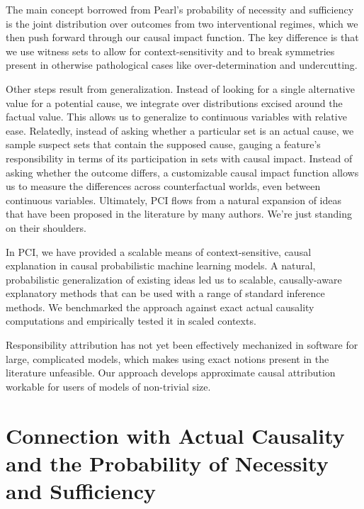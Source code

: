 \documentclass[anon,12pt]{clear2026} %
\newcommand{\ourapproach}{PCI }
\newcommand{\Ourapproach}{PCI}
\begin{document}
The main concept borrowed from Pearl's probability of necessity and sufficiency is the joint distribution over outcomes from two interventional regimes, which we then push forward through our causal impact function.  The key difference is that we use witness sets to allow for context-sensitivity and to break symmetries present in otherwise pathological cases like over-determination and undercutting.

Other steps result from generalization. Instead of looking for a single alternative value for a potential cause, we integrate over distributions excised around the factual value. This allows us to generalize to continuous variables with relative ease. Relatedly, instead of asking whether a particular set is an actual cause, we sample suspect sets that contain the supposed cause, gauging a feature's responsibility in terms of its participation in sets with causal impact. Instead of asking whether the outcome differs, a customizable causal impact function allows us to measure the differences across counterfactual worlds, even between continuous variables. Ultimately, \ourapproach flows from a natural expansion of ideas that have been proposed in the literature by many authors. We're just standing on their shoulders.


In \Ourapproach, we have provided a scalable means of context-sensitive, causal explanation in causal probabilistic machine learning models. A natural, probabilistic generalization of existing ideas led us to scalable, causally-aware explanatory methods that can be used with a range of standard inference methods. We benchmarked the approach against exact actual causality computations and empirically tested it in scaled contexts. 

Responsibility attribution has not yet been effectively mechanized in software for large, complicated models, which makes using exact notions present in the literature unfeasible. Our approach develops approximate causal attribution workable for users of models of non-trivial size. 


\newpage 

% 


\newpage 

\appendix

\section{Connection with Actual Causality and the Probability of Necessity and Sufficiency}\label{app:conceptual}
\end{document}
